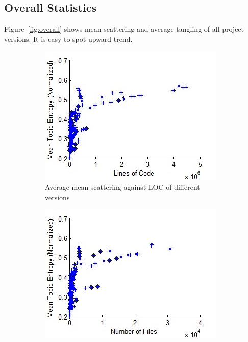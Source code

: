 \documentclass[12pt]{article}
\begin{document}
\subsection{Overall Statistics} \label{Overall Statistics}
Figure~\ref{fig:overall} shows mean scattering and average tangling of all project versions. It is easy to spot upward trend.
\begin{figure}
        \centering
        \begin{subfigure}[b]{0.5\textwidth}
                \centering
                \includegraphics[width=\textwidth]{mean-scattering-vs-loc-overall.jpg}
                \caption{Average mean scattering against LOC of different versions}
                \label{overall-scatter1}
        \end{subfigure}%
        \begin{subfigure}[b]{0.5\textwidth}
                \centering
                \includegraphics[width=\textwidth]{mean-scattering-vs-num-files-overall.jpg}

\end{subfigure}
\end{figure}
\end{document}
